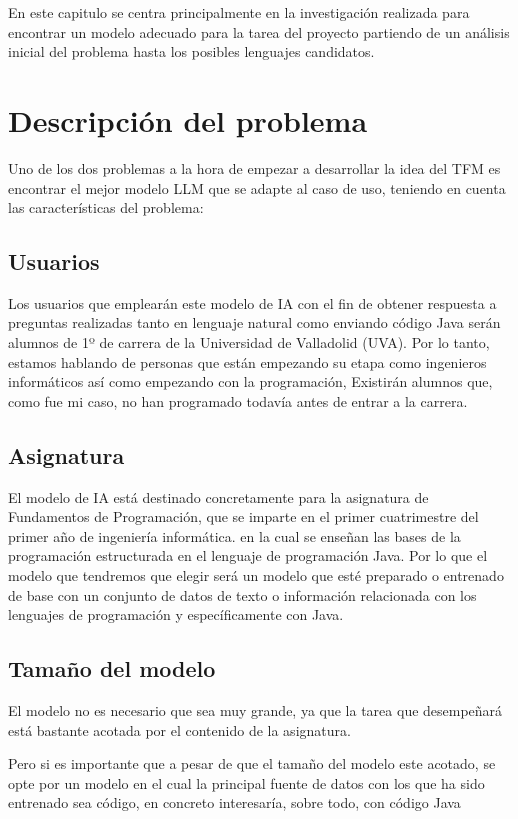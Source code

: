 En este capitulo se centra principalmente en la investigación realizada para encontrar un modelo adecuado para la tarea del proyecto partiendo de un análisis inicial del problema hasta los posibles lenguajes candidatos. 

\section{Descripción del problema}
Uno de los dos problemas a la hora de empezar a desarrollar la idea del TFM es encontrar el mejor modelo LLM que se adapte al caso de uso, teniendo en cuenta las características del problema:

\subsection{Usuarios}
Los usuarios que emplearán este modelo de IA con el fin de obtener respuesta a preguntas realizadas tanto en lenguaje natural como enviando código Java serán alumnos de 1º de carrera de la Universidad de Valladolid (UVA). Por lo tanto, estamos hablando de personas que están empezando su etapa como ingenieros informáticos así como empezando con la programación, Existirán alumnos que, como fue mi caso, no han programado todavía antes de entrar a la carrera.

\subsection{Asignatura}
El modelo de IA está destinado concretamente para la asignatura de Fundamentos de Programación, que se imparte en el primer cuatrimestre del primer año de ingeniería informática. en la cual se enseñan las bases de la programación estructurada en el lenguaje de programación Java. Por lo que el modelo que tendremos que elegir será un modelo que esté preparado o entrenado de base con un conjunto de datos de texto o información relacionada con los lenguajes de programación y específicamente con Java.

\subsection{Tamaño del modelo}
El modelo no es necesario que sea muy grande, ya que la tarea que desempeñará está bastante acotada por el contenido de la asignatura.

Pero si es importante que a pesar de que el tamaño del modelo este acotado, se opte por un modelo en el cual la principal fuente de datos con los que ha sido entrenado sea código, en concreto interesaría, sobre todo, con código Java

